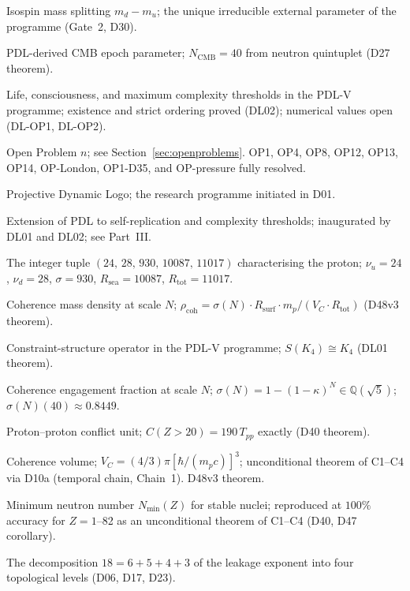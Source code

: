 \documentclass[11pt,a4paper]{article}
\theoremstyle{plain}
\theoremstyle{definition}
\theoremstyle{remark}
\newcommand{\quintuplet}{(24,\,28,\,930,\,10087,\,11017)}
\newcommand{\Rsurf}{R_{\mathrm{surf}}}
\newcommand{\Rtot}{R_{\mathrm{tot}}}
\newcommand{\sigmaN}{\sigma(N)}
\newcommand{\Tpp}{T_{pp}}
\newcommand{\rhocoh}{\rho_{\mathrm{coh}}}
\begin{document}
\begin{description}[leftmargin=3.5cm, style=nextline]
\item[$m_{\mathrm{iso}}$] Isospin mass splitting $m_d-m_u$; the unique irreducible external parameter of the programme (Gate~2, D30).
\item[$N_{\mathrm{CMB}}$] PDL-derived CMB epoch parameter; $N_{\mathrm{CMB}}=40$ from neutron quintuplet (D27 theorem).
\item[$n^*_{\mathrm{life}}$, $n^*_{\mathrm{consciousness}}$, $n^*_{\mathrm{max}}$] Life, consciousness, and maximum complexity thresholds in the PDL-V programme; existence and strict ordering proved (DL02); numerical values open (DL-OP1, DL-OP2).
\item[OP$n$] Open Problem $n$; see Section~\ref{sec:openproblems}. OP1, OP4, OP8, OP12, OP13, OP14, OP-London, OP1-D35, and OP-pressure fully resolved.
\item[PDL] Projective Dynamic Logo; the research programme initiated in D01.
\item[PDL-V programme] Extension of PDL to self-replication and complexity thresholds; inaugurated by DL01 and DL02; see Part~III.
\item[Quintuplet] The integer tuple $\quintuplet$ characterising the proton; $\nu_u=24$, $\nu_d=28$, $\sigma=930$, $R_{\mathrm{sea}}=10087$, $R_{\mathrm{tot}}=11017$.
\item[$\rhocoh(N)$] Coherence mass density at scale $N$; $\rhocoh = \sigmaN\cdot\Rsurf\cdot m_p/(V_C\cdot\Rtot)$ (D48v3 theorem).
\item[$S(\Gamma)$] Constraint-structure operator in the PDL-V programme; $S(K_4) \cong K_4$ (DL01 theorem).
\item[$\sigmaN(N)$] Coherence engagement fraction at scale $N$; $\sigmaN=1-(1-\kappa)^N\in\mathbb{Q}(\sqrt{5})$; $\sigmaN(40)\approx 0.8449$.
\item[$\Tpp$] Proton--proton conflict unit; $C(Z>20)=190\,\Tpp$ exactly (D40 theorem).
\item[$V_C$] Coherence volume; $V_C=(4/3)\pi[\hbar/(m_pc)]^3$; unconditional theorem of C1--C4 via D10a (temporal chain, Chain~1). D48v3 theorem.
\item[Valley of stability] Minimum neutron number $N_{\min}(Z)$ for stable nuclei; reproduced at $100\%$ accuracy for $Z=1$--82 as an unconditional theorem of C1--C4 (D40, D47 corollary).
\item[18-filter hierarchy] The decomposition $18=6+5+4+3$ of the leakage exponent into four topological levels (D06, D17, D23).
\end{description}
\end{document}
